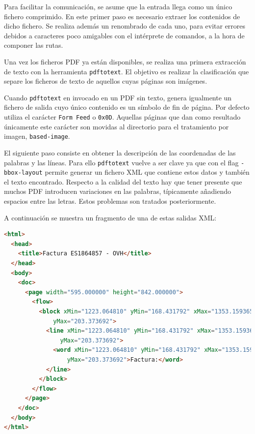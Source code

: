 
Para facilitar la comunicación, se asume que la entrada llega como un único fichero comprimido. En este primer paso es necesario extraer los contenidos de dicho fichero. Se realiza además un renombrado de cada uno, para evitar errores debidos a caracteres poco amigables con el intérprete de comandos, a la hora de componer las rutas.

Una vez los ficheros PDF ya están disponibles, se realiza una primera extracción de texto con la herramienta \verb|pdftotext|. El objetivo es realizar la clasificación que separe los ficheros de texto de aquellos cuyas páginas son imágenes.

Cuando \verb|pdftotext| en invocado en un PDF sin texto, genera igualmente un fichero de salida cuyo único contenido es un símbolo de fin de página. Por defecto utiliza el carácter \verb|Form Feed| o \verb|0x0D|. Aquellas páginas que dan como resultado únicamente este carácter son movidas al directorio para el tratamiento por imagen, \verb|based-image|.

El siguiente paso consiste en obtener la descripción de las coordenadas de las palabras y las líneas. Para ello \verb|pdftotext| vuelve a ser clave ya que con el flag \verb|-bbox-layout| permite generar un fichero XML que contiene estos datos y también el texto encontrado. Respecto a la calidad del texto hay que tener presente que muchos PDF introducen variaciones en las palabras, típicamente añadiendo espacios entre las letras. Estos problemas son tratados posteriormente.

A continuación se muestra un fragmento de una de estas salidas XML:

\begin{lstlisting}[language=HTML,caption={Obtención del identificador del trabajo},label=lst:salida-pdftotext]
<html>
  <head>
    <title>Factura ES1864857 - OVH</title>
  </head>
  <body>
    <doc>
      <page width="595.000000" height="842.000000">
        <flow>
          <block xMin="1223.064810" yMin="168.431792" xMax="1353.159365" 
              yMax="203.373692">
            <line xMin="1223.064810" yMin="168.431792" xMax="1353.159365" 
                yMax="203.373692">
              <word xMin="1223.064810" yMin="168.431792" xMax="1353.159365" 
                  yMax="203.373692">Factura:</word>
            </line>
          </block>
        </flow>
      </page>
    </doc>
  </body>
</html>
\end{lstlisting}


